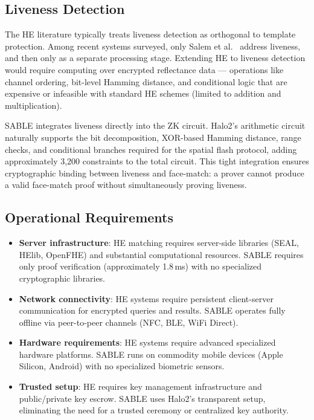 \documentclass[conference]{IEEEtran}
\begin{document}
\subsection{Liveness Detection}

The HE literature typically treats liveness detection as orthogonal to template protection. Among recent systems surveyed, only Salem et al.~\cite{salem2021} address liveness, and then only as a separate processing stage. Extending HE to liveness detection would require computing over encrypted reflectance data --- operations like channel ordering, bit-level Hamming distance, and conditional logic that are expensive or infeasible with standard HE schemes (limited to addition and multiplication).

SABLE integrates liveness directly into the ZK circuit. Halo2's arithmetic circuit naturally supports the bit decomposition, XOR-based Hamming distance, range checks, and conditional branches required for the spatial flash protocol, adding approximately 3,200 constraints to the total circuit. This tight integration ensures cryptographic binding between liveness and face-match: a prover cannot produce a valid face-match proof without simultaneously proving liveness.

\subsection{Operational Requirements}

\begin{itemize}
\item \textbf{Server infrastructure}: HE matching requires server-side libraries (SEAL, HElib, OpenFHE) and substantial computational resources. SABLE requires only proof verification (approximately 1.8\,ms) with no specialized cryptographic libraries.

\item \textbf{Network connectivity}: HE systems require persistent client-server communication for encrypted queries and results. SABLE operates fully offline via peer-to-peer channels (NFC, BLE, WiFi Direct).

\item \textbf{Hardware requirements}: HE systems require advanced specialized hardware platforms. SABLE runs on commodity mobile devices (Apple Silicon, Android) with no specialized biometric sensors.

\item \textbf{Trusted setup}: HE requires key management infrastructure and public/private key escrow. SABLE uses Halo2's transparent setup, eliminating the need for a trusted ceremony or centralized key authority.
\end{itemize}
\end{document}
